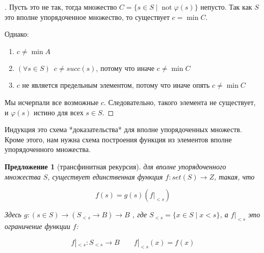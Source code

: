 \documentclass[10pt, a4paper]{article}
\theoremstyle{colon}
\newtheorem*{prop*}{Предложение}
\begin{document}
\begin{proof}[\unskip\indent\nopunct]
Пусть это не так, тогда множество \( C = \{s \in S \mid \operatorname{not} \varphi(s)\} \) непусто.
Так как \( S \) это вполне упорядоченное множество, то существует \( c = \operatorname{min} C \).

Однако:

\begin{enumerate}
\item \( c \ne \operatorname{min} A \)
\item \( (\forall s \in S)\enspace c \ne succ(s) \), потому что иначе \( c \ne \operatorname{min} C \)
\item \( c \) не является предельным элементом, потому что иначе опять \( c \ne \operatorname{min} C \)
\end{enumerate}

Мы исчерпали все возможные \( c \). Следовательно, такого элемента не существует, и \( \varphi(s) \) истино для всех \( s \in S \).
\end{proof}

Индукция это схема *доказательства* для вполне упорядоченных множеств. Кроме этого, нам нужна схема построения
функция из элементов вполне упорядоченного множества.

\begin{prop*}[трансфинитная рекурсия]
для вполне упорядоченного множества \( S \),
существует единственная функция \( f : set(S) \to Z \), такая, что

\[f(s) = g(s)(f|_{< s})\]

Здесь \( g : (s \in S) \to (S_{<s} \to B) \to B \) , где \( S_{<s} = \{x \in S \mid x < s\} \),
а \( f|_{< s} \) это ограничение функции \( f \):

\[
f|_{< s} : S_{<s} \to B
\qquad
f|_{< s}(x) = f(x)
\]
\end{prop*}
\end{document}
